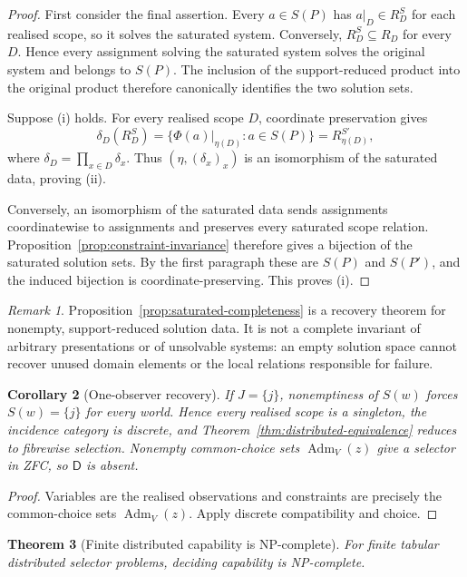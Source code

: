 \documentclass[11pt]{article}
\theoremstyle{plain}
\newtheorem{theorem}{Theorem}[section]
\newtheorem{corollary}[theorem]{Corollary}
\theoremstyle{definition}
\theoremstyle{remark}
\newtheorem{remark}[theorem]{Remark}
\newcommand{\Adm}{\operatorname{Adm}}
\begin{document}
\begin{proof}
First consider the final assertion. Every $a\in S(P)$ has
$a|_D\in R_D^{S}$ for each realised scope, so it solves the saturated system.
Conversely, $R_D^{S}\subseteq R_D$ for every $D$. Hence every assignment solving
the saturated system solves the original system and belongs to $S(P)$. The inclusion of the support-reduced product into
the original product therefore canonically identifies the two solution sets.

Suppose (i) holds. For every realised scope $D$, coordinate preservation gives
\[
\delta_D(R_D^{S})
=\{\Phi(a)|_{\eta(D)}:a\in S(P)\}
=R_{\eta(D)}^{S'},
\]
where $\delta_D=\prod_{x\in D}\delta_x$. Thus $(\eta,(\delta_x)_x)$ is an
isomorphism of the saturated data, proving (ii).

Conversely, an isomorphism of the saturated data sends assignments
coordinatewise to assignments and preserves every saturated scope relation.
Proposition~\ref{prop:constraint-invariance} therefore gives a bijection of the
saturated solution sets. By the first paragraph these are $S(P)$ and $S(P')$,
and the induced bijection is coordinate-preserving. This proves (i).
\end{proof}

\begin{remark}
Proposition~\ref{prop:saturated-completeness} is a recovery theorem for nonempty,
support-reduced solution data. It is not a complete invariant of arbitrary
presentations or of unsolvable systems: an empty solution space cannot recover
unused domain elements or the local relations responsible for failure.
\end{remark}

\begin{corollary}[One-observer recovery]\label{cor:distributed-one}
If $J=\{j\}$, nonemptiness of $S(w)$ forces $S(w)=\{j\}$ for every world.
Hence every realised scope is a singleton, the incidence category is discrete,
and Theorem~\ref{thm:distributed-equivalence} reduces to fibrewise selection. Nonempty common-choice sets $\Adm_V(z)$ give a selector in ZFC, so $\mathsf D$ is absent.
\end{corollary}

\begin{proof}
Variables are the realised observations and constraints are precisely the
common-choice sets $\Adm_V(z)$. Apply discrete compatibility and choice.
\end{proof}

\begin{theorem}[Finite distributed capability is NP-complete]
\label{thm:distributed-NP}
For finite tabular distributed selector problems, deciding capability is
NP-complete.
\end{theorem}
\end{document}
